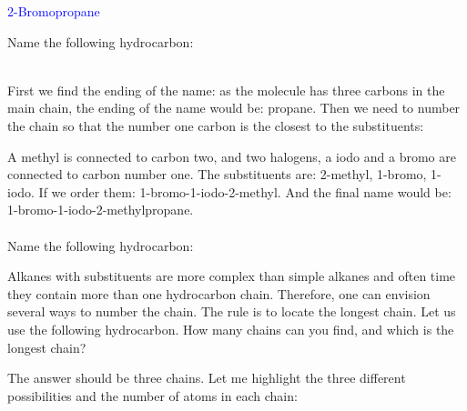 \documentclass[main.tex]{subfiles}
\begin{document}
\begin{description}
\begin{center}  \hspace{0.5cm}\textcolor{blue}{2-Bromopropane}\end{center}




\begin{example} %
Name the following hydrocarbon:
\begin{center} \end{center}
\\
First we find the ending of the name: as the molecule has three carbons in the main chain, the ending of the name would be: propane. Then we need to number the chain so that the number one carbon is the closest to the substituents:
\begin{center} \end{center}
A methyl is connected to carbon two, and two halogens, a iodo and a bromo are connected to carbon number one. The substituents are: 2-methyl, 1-bromo, 1-iodo. If we order them: 1-bromo-1-iodo-2-methyl. And the final name would be: 1-bromo-1-iodo-2-methylpropane.
\\
\faDiamond\ \\
Name the following hydrocarbon:
\begin{center} \end{center}
\end{example}%




\item[\docfilehook{  Finding the longest chain}{Finding the longest the chain}] Alkanes with substituents are more complex than simple alkanes and often time they contain more than one hydrocarbon chain. Therefore, one can envision several ways to number the chain. The rule is to locate the longest chain. Let us use the following hydrocarbon. How many chains can you find, and which is the longest chain?

\begin{center}  \end{center}
The answer should be three chains. Let me highlight the three different possibilities and the number of atoms in each chain:




\end{description}
\end{document}
